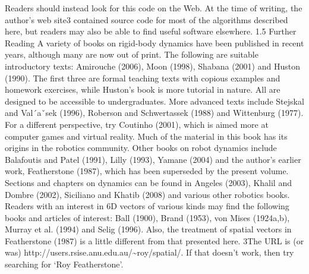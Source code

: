Readers should instead look for this code on the Web. At the time of writing, the author’s web site3 contained source code for most of the algorithms described here, but readers may also be able to find useful software elsewhere. 1.5 Further Reading A variety of books on rigid-body dynamics have been published in recent years, although many are now out of print. The following are suitable introductory texts: Amirouche (2006), Moon (1998), Shabana (2001) and Huston (1990). The first three are formal teaching texts with copious examples and homework exercises, while Huston’s book is more tutorial in nature. All are designed to be accessible to undergraduates. More advanced texts include Stejskal and Val´aˇsek (1996), Roberson and Schwertassek (1988) and Wittenburg (1977). For a different perspective, try Coutinho (2001), which is aimed more at computer games and virtual reality. Much of the material in this book has its origins in the robotics community. Other books on robot dynamics include Balafoutis and Patel (1991), Lilly (1993), Yamane (2004) and the author’s earlier work, Featherstone (1987), which has been superseded by the present volume. Sections and chapters on dynamics can be found in Angeles (2003), Khalil and Dombre (2002), Siciliano and Khatib (2008) and various other robotics books. Readers with an interest in 6D vectors of various kinds may find the following books and articles of interest: Ball (1900), Brand (1953), von Mises (1924a,b), Murray et al. (1994) and Selig (1996). Also, the treatment of spatial vectors in Featherstone (1987) is a little different from that presented here. 3The URL is (or was) http://users.rsise.anu.edu.au/\textasciitilde{}roy/spatial/. If that doesn’t work, then try searching for ‘Roy Featherstone’.
